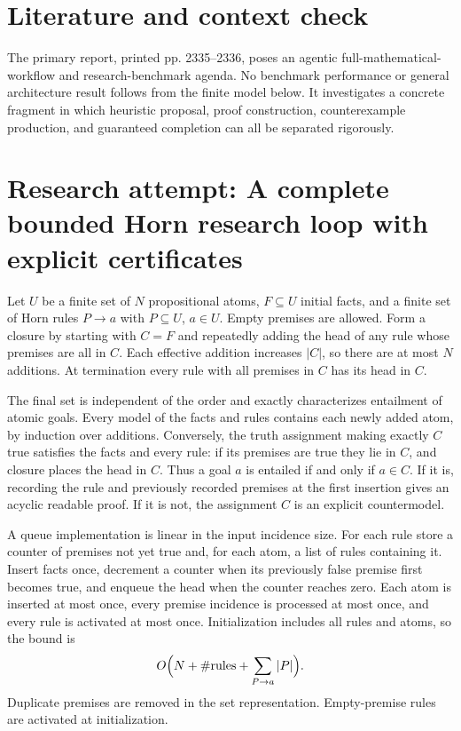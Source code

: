 \documentclass[11pt]{article}
\begin{document}
\section{Literature and context check}
The primary report, printed pp. 2335--2336, poses an agentic full-mathematical-workflow and research-benchmark agenda. No benchmark performance or general architecture result follows from the finite model below. It investigates a concrete fragment in which heuristic proposal, proof construction, counterexample production, and guaranteed completion can all be separated rigorously.
\section{Research attempt: A complete bounded Horn research loop with explicit certificates}

Let $U$ be a finite set of $N$ propositional atoms, $F\subseteq U$ initial facts, and a finite set of Horn rules $P\to a$ with $P\subseteq U$, $a\in U$. Empty premises are allowed. Form a closure by starting with $C=F$ and repeatedly adding the head of any rule whose premises are all in $C$. Each effective addition increases $|C|$, so there are at most $N$ additions. At termination every rule with all premises in $C$ has its head in $C$.

The final set is independent of the order and exactly characterizes entailment of atomic goals. Every model of the facts and rules contains each newly added atom, by induction over additions. Conversely, the truth assignment making exactly $C$ true satisfies the facts and every rule: if its premises are true they lie in $C$, and closure places the head in $C$. Thus a goal $a$ is entailed if and only if $a\in C$. If it is, recording the rule and previously recorded premises at the first insertion gives an acyclic readable proof. If it is not, the assignment $C$ is an explicit countermodel.

A queue implementation is linear in the input incidence size. For each rule store a counter of premises not yet true and, for each atom, a list of rules containing it. Insert facts once, decrement a counter when its previously false premise first becomes true, and enqueue the head when the counter reaches zero. Each atom is inserted at most once, every premise incidence is processed at most once, and every rule is activated at most once. Initialization includes all rules and atoms, so the bound is
\[
O\Bigl(N+\#\text{rules}+\sum_{P\to a}|P|\Bigr).
\]
Duplicate premises are removed in the set representation. Empty-premise rules are activated at initialization.
\end{document}
